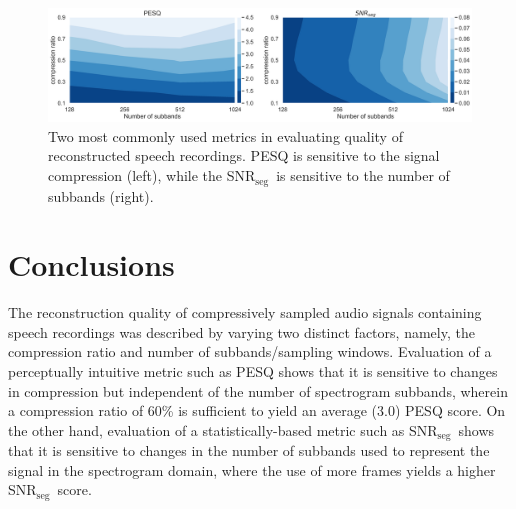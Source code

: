 \documentclass[10pt,a4paper,twoside]{article}
\newcommand{\snrseg}{SNR$_{\mathrm{seg}}$}
\begin{document}
\begin{figure}[tb]
	\centering
	\includegraphics[width=\textwidth]{metrics.png}
	\caption{Two most commonly used metrics in evaluating quality of reconstructed speech recordings. PESQ is sensitive to the signal compression (left), while the \snrseg~is sensitive to the number of subbands (right).}
	\label{fig:pesq-snr}
\end{figure}


\section{Conclusions}
The reconstruction quality of compressively sampled audio signals containing speech recordings was described by varying two distinct factors, namely, the compression ratio and number of subbands/sampling windows. Evaluation of a perceptually intuitive metric such as PESQ shows that it is sensitive to changes in compression but independent of the number of spectrogram subbands, wherein a compression ratio of 60\% is sufficient to yield an average (3.0) PESQ score. On the other hand, evaluation of a statistically-based metric such as \snrseg~shows that it is sensitive to changes in the number of subbands used to represent the signal in the spectrogram domain, where the use of more frames yields a higher \snrseg~score.




\end{document}
